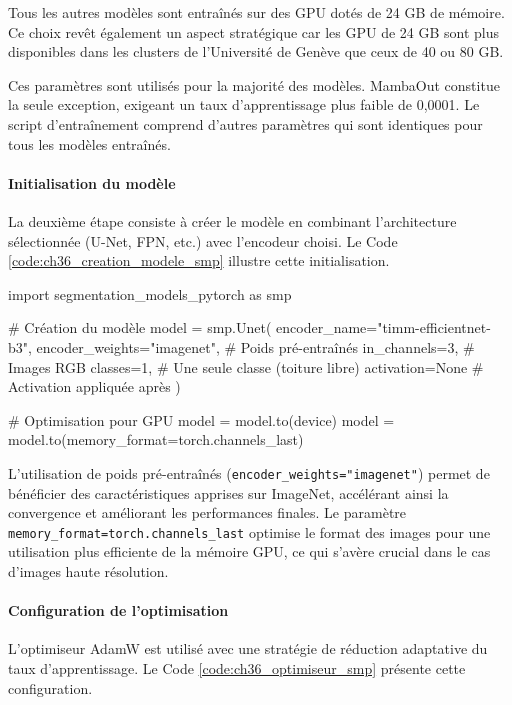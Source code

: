 Tous les autres modèles sont entraînés sur des GPU dotés de 24 GB de mémoire. Ce choix revêt également un aspect stratégique car les GPU de 24 GB sont plus disponibles dans les clusters de l'Université de Genève que ceux de 40 ou 80 GB.

Ces paramètres sont utilisés pour la majorité des modèles. MambaOut constitue la seule exception, exigeant un taux d'apprentissage plus faible de 0,0001. Le script d'entraînement comprend d'autres paramètres qui sont identiques pour tous les modèles entraînés.

\paragraph{Initialisation du modèle}
La deuxième étape consiste à créer le modèle en combinant l'architecture sélectionnée (U-Net, FPN, etc.) avec l'encodeur choisi. Le Code \ref{code:ch36_creation_modele_smp} illustre cette initialisation.

\begin{code}[H]
    \begin{pythoncode}
        import segmentation_models_pytorch as smp

        # Création du modèle
        model = smp.Unet(
            encoder_name="timm-efficientnet-b3",
            encoder_weights="imagenet",  # Poids pré-entraînés
            in_channels=3,               # Images RGB
            classes=1,                   # Une seule classe (toiture libre)
            activation=None              # Activation appliquée après
        )
        
        # Optimisation pour GPU
        model = model.to(device)
        model = model.to(memory_format=torch.channels_last)
    \end{pythoncode}
    \caption{Création et initialisation d'un modèle SMP}
    \label{code:ch36_creation_modele_smp}
\end{code}

L'utilisation de poids pré-entraînés (\texttt{encoder\_weights="imagenet"}) permet de bénéficier des caractéristiques apprises sur ImageNet, accélérant ainsi la convergence et améliorant les performances finales. Le paramètre \texttt{memory\_format=torch.channels\_last} \cite{noauthor_beta_nodate} optimise le format des images pour une utilisation plus efficiente de la mémoire GPU, ce qui s'avère crucial dans le cas d'images haute résolution.

\paragraph{Configuration de l'optimisation}
L'optimiseur AdamW est utilisé avec une stratégie de réduction adaptative du taux d'apprentissage. Le Code \ref{code:ch36_optimiseur_smp} présente cette configuration.

